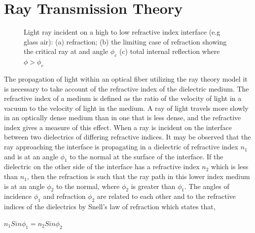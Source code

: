 \documentclass[12pt]{report}
\begin{document}
	\section{Ray Transmission Theory}
		\begin{figure}[htbp]
		\caption{Light ray incident on a high to low refractive index interface (e.g glass air): (a) refraction; (b) the limiting case of refraction showing the critical ray at and angle $\phi_c$ (c) total internal reflection where $\phi > \phi_c$}
		\label{fig1}
	\end{figure}
The propagation of light within an optical fiber utilizing the ray theory model it is necessary to take account of the refractive index of the dielectric medium. The refractive index of a medium is defined as the ratio of the velocity of light in a vacuum to the velocity of light in the medium. A ray of light travels more slowly in an optically dense medium than in one that is less dense, and the refractive index gives a measure of this effect. When a ray is incident on the interface between two dielectrics of differing refractive indices. It may be observed that the ray approaching the interface is propagating in a dielectric of refractive index $n_1$ and is at an angle $\phi_1$ to the normal at the surface of the interface. If the dielectric on the other side of the interface has a refractive index $n_2$ which is less than $n_1$, then the refraction is such that the ray path in this lower index medium is at an angle $\phi_2$ to the normal, where $\phi_2$  is greater than $\phi_1$. The angles of incidence $\phi_1$ and refraction $\phi_2$ are related to each other and to the refractive indices of the dielectrics by Snell’s law of refraction which states that,
\begin{center}
	$n_1 Sin \phi_1 = n_2 Sin \phi_2$
\end{center}
\end{document}
